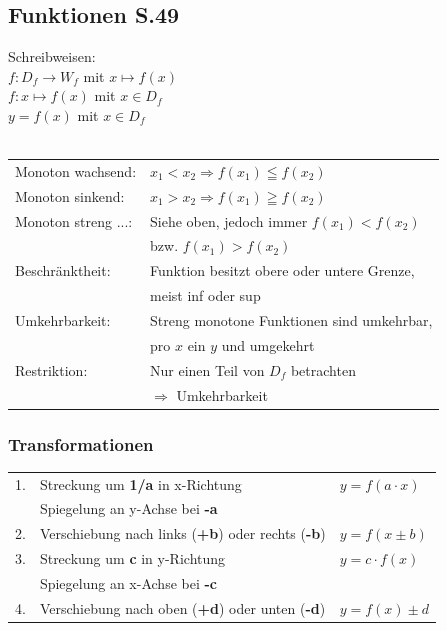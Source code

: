 	\subsection{Funktionen S.49}

		Schreibweisen: \\
		$f:D_f \rightarrow W_f$ mit $x \mapsto f(x)$\\
		$f:x \mapsto f(x)$ mit $x \in D_f$\\
		$y=f(x)$ mit $x \in D_f$		 \\	
		\\
		\begin{tabular}{ll}
			Monoton wachsend:   & $x_1 < x_2 \Rightarrow f(x_1) \leqq f(x_2)$ \\
			Monoton sinkend:    & $x_1 > x_2 \Rightarrow f(x_1) \geqq f(x_2)$ \\
			Monoton streng ...: & Siehe oben, jedoch immer $f(x_1) < f(x_2)$ \\ 
			                    & bzw. $f(x_1) > f(x_2)$ \\
			Beschränktheit:     & Funktion besitzt obere oder untere Grenze, \\ 
			                    & meist inf oder sup \\
			Umkehrbarkeit:      & Streng monotone Funktionen sind umkehrbar, \\ 
			                    & pro $x$ ein $y$ und umgekehrt \\
			Restriktion:        & Nur einen Teil von $D_f$ betrachten \\ 
				                & $\Rightarrow$ Umkehrbarkeit \\
		\end{tabular}
						
		\subsubsection{Transformationen}	
			\begin{tabular}{lll}
				1. & Streckung um \textbf{1/a} in x-Richtung & $y = f(a \cdot x)$ \\
				   & Spiegelung an y-Achse bei \textbf{-a} & \\
				2. & Verschiebung nach links (\textbf{+b}) oder rechts  (\textbf{-b}) & $y = f(x \pm b)$\\
				3. & Streckung um \textbf{c} in y-Richtung & $y = c \cdot f(x)$ \\
				   & Spiegelung an x-Achse bei \textbf{-c} & \\
				4. & Verschiebung nach oben (\textbf{+d}) oder unten (\textbf{-d}) & $y = f(x) \pm d $ \\
			\end{tabular}
			
